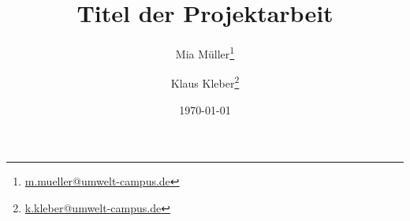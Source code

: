 %
%
\titlehead{\texttt{[image: Bilder//Logo\_UCB.pdf]}}
%
\title{Titel der Projektarbeit}
%
\author{
				Mia Müller\thanks{\href{mailto:m.mueller@umwelt-campus.de}{m.mueller@umwelt-campus.de}}
				\and
				Klaus Kleber\thanks{\href{mailto:k.kleber@umwelt-campus.de}{k.kleber@umwelt-campus.de}}
				}
%
\date{\small\today}
\publishers{\vspace{1cm}\normalsize Betreuer: Dr.-Ing. Lukas Lentz}
\maketitle
%
%
